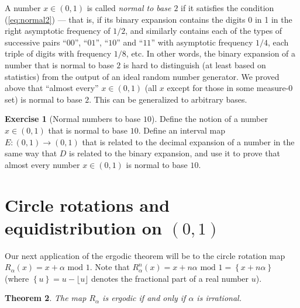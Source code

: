 \documentclass[11pt]{report}
\theoremstyle{plain}
\newtheorem{thm}{Theorem}[chapter]
\theoremstyle{definition}
\newtheorem{xexercise}[thm]{Exercise}
\begin{document}
A number $x\in (0,1)$ is called \emph{normal to base $2$}
if it satisfies the condition (\ref{eq:normal2}) --- that
is, if its binary expansion contains the digits 0 in 1
in the right asymptotic frequency of $1/2$, and
similarly contains each of the types of successive
pairs ``$00$'', ``$01$'', ``$10$'' and ``$11$'' with
asymptotic frequency $1/4$, each triple of digits
with frequency $1/8$, etc. In other words, the binary
expansion of a number that is normal to base $2$ is
hard to distinguish (at least based on statistics)
from the output of an ideal random number generator.
We proved above that ``almost every'' $x\in (0,1)$
(all $x$ except for those in some measure-$0$ set) is
normal to base $2$. This can be generalized to
arbitrary bases.

\begin{xexercise}[Normal numbers to base $10$]
Define the notion of a number $x\in(0,1)$ that is
normal to base $10$. Define an interval map
$E:(0,1)\to(0,1)$ that is related to the decimal
expansion of a number in the same way that $D$ is
related to the binary expansion, and use it to prove
that almost every number $x\in(0,1)$ is normal to
base $10$.
\end{xexercise}

\section{Circle rotations and equidistribution on $(0,1)$}
Our next application of the ergodic theorem will be
to the circle rotation map
$R_\alpha(x)=x+\alpha\textrm{ mod }1$. Note that
$R_\alpha^n(x)=x+n\alpha\textrm{ mod }1 = \left\{
x+n\alpha \right\}$
(where $\left\{u\right\}=u-\lfloor u \rfloor$ denotes
the fractional part of a real number $u$).

\begin{thm}
The map $R_\alpha$ is ergodic if and only if $\alpha$
is irrational.
\end{thm}
\end{document}

